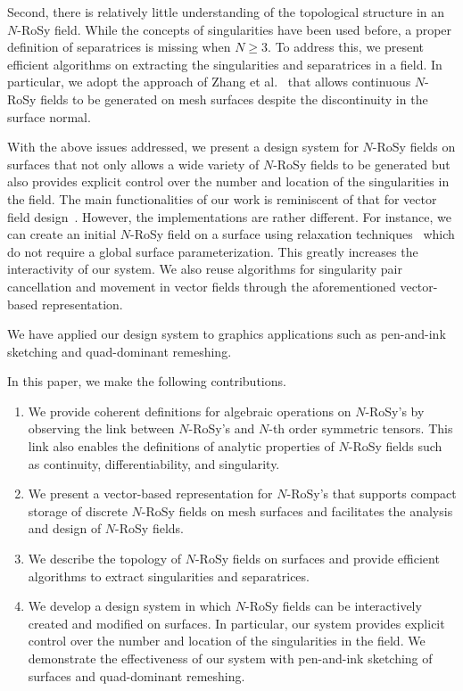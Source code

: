 \documentclass{acmsiggraph}               %
\begin{document}
Second, there is relatively little understanding of the topological
structure in an $N$-RoSy field. While the concepts of singularities
have been used before, a proper definition of separatrices is
missing when $N \ge 3$. To address this, we present efficient
algorithms on extracting the singularities and separatrices in a
field. In particular, we adopt the approach of Zhang et
al.~ that allows continuous $N$-RoSy fields to
be generated on mesh surfaces despite the discontinuity in the
surface normal.


With the above issues addressed, we present a design system for
$N$-RoSy fields on surfaces that not only allows a wide variety of
$N$-RoSy fields to be generated but also provides explicit control
over the number and location of the singularities in the field. The
main functionalities of our work is reminiscent of that for vector
field design~\cite{Zhang:06}. However, the implementations are
rather different. For instance, we can create an initial $N$-RoSy
field on a surface using relaxation techniques~\cite{Turk:01} which
do not require a global surface parameterization. This greatly
increases the interactivity of our system. We also reuse algorithms
for singularity pair cancellation and movement in vector fields
through the aforementioned vector-based representation.

We have applied our design system to graphics applications such as
pen-and-ink sketching and quad-dominant remeshing.

In this paper, we make the following contributions.

\begin{enumerate}
\item We provide coherent definitions for algebraic
operations on $N$-RoSy's by observing the link between $N$-RoSy's
and $N$-th order symmetric tensors. This link also enables the
definitions of analytic properties of $N$-RoSy fields such as
continuity, differentiability, and singularity.
\item We present a vector-based representation for $N$-RoSy's that
supports compact storage of discrete $N$-RoSy fields on mesh
surfaces and facilitates the analysis and design of $N$-RoSy fields.
\item We describe the topology of $N$-RoSy fields on surfaces
and provide efficient algorithms to extract singularities and
separatrices.
\item We develop a design system in which $N$-RoSy fields
can be interactively created and modified on surfaces. In
particular, our system provides explicit control over the number and
location of the singularities in the field. We demonstrate the
effectiveness of our system with pen-and-ink sketching of surfaces
and quad-dominant remeshing.
\end{enumerate}
\end{document}
